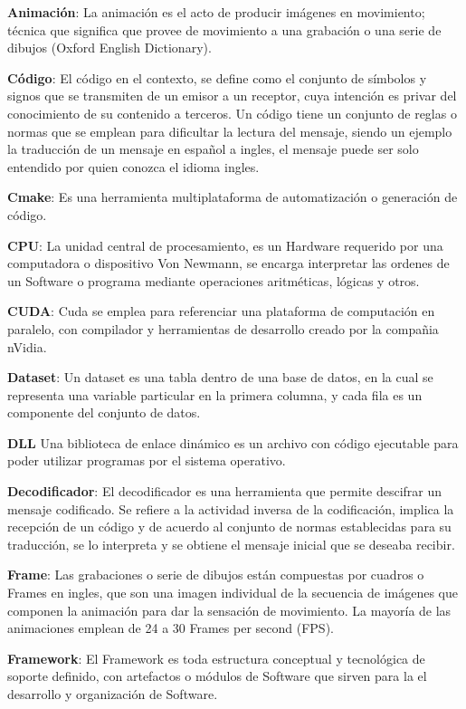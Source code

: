 \textbf{Animación}: La animación es el acto de producir imágenes en movimiento; técnica que significa que provee de movimiento a una grabación o una serie de dibujos (Oxford English Dictionary). 

\textbf{Código}: El código en el contexto, se define como el conjunto de símbolos y signos que se transmiten de un emisor a un receptor, cuya intención es privar del conocimiento de su contenido a terceros. Un código tiene un conjunto de reglas o normas que se emplean para dificultar la lectura del mensaje, siendo un ejemplo la traducción de un mensaje en español a ingles, el mensaje puede ser solo entendido por quien conozca el idioma ingles.

\textbf{Cmake}: Es una herramienta multiplataforma de automatización o generación de código.

\textbf{CPU}: La unidad central de procesamiento, es un Hardware requerido por una computadora o dispositivo Von Newmann, se encarga interpretar las ordenes de un Software o programa mediante operaciones aritméticas, lógicas y otros.

\textbf{CUDA}: Cuda se emplea para referenciar una plataforma de computación en paralelo, con compilador y herramientas de desarrollo creado por la compañia nVidia.

\textbf{Dataset}: Un dataset es una tabla dentro de una base de datos, en la cual se representa una variable particular en la primera columna, y cada fila es un componente del conjunto de datos.

\textbf{DLL} Una biblioteca de enlace dinámico es un archivo con código ejecutable para poder utilizar programas por el sistema operativo.

\textbf{Decodificador}: El decodificador es una herramienta que permite descifrar un mensaje codificado. Se refiere a la actividad inversa de la codificación, implica la recepción de un código y de acuerdo al conjunto de normas establecidas para su traducción, se lo interpreta y se obtiene el mensaje inicial que se deseaba recibir.

\textbf{Frame}: Las grabaciones o serie de dibujos están compuestas por cuadros o Frames en ingles, que son una imagen individual de la secuencia de imágenes que componen la animación para dar la sensación de movimiento. La mayoría de las animaciones emplean de 24 a 30 Frames per second (FPS). 

\textbf{Framework}: El Framework es toda estructura conceptual y tecnológica de soporte definido, con artefactos o módulos de Software que sirven para la el desarrollo y organización de Software.

